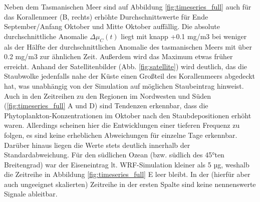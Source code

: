 \documentclass[12pt,a4paper,onecolumn,headheight=30pt]{scrartcl}
\begin{document}
Neben dem Tasmanischen Meer sind auf Abbildung \ref{fig:timeseries_full} auch für das Korallenmeer (B, rechts) erhöhte Durchschnittswerte für Ende September/Anfang Oktober und Mitte Oktober auffällig. Die absolute durchschnittliche Anomalie $\Delta \mu_C(t)$ liegt mit knapp +0.1 mg/m3 bei weniger als der Hälfte der durchschnittlichen Anomalie des tasmanischen Meers mit über 0.2 mg/m3 zur ähnlichen Zeit. Außerdem wird das Maximum etwas früher erreicht. Anhand der Satellitenbilder (Abb. \ref{fig:satellite}) wird deutlich, das die Staubwolke jedenfalls nahe der Küste einen Großteil des Korallenmeers abgedeckt hat, was unabhängig von der Simulation auf möglichen Staubeintrag hinweist. Auch in den Zeitreihen zu den Regionen im Nordwesten und Süden (\ref{fig:timeseries_full} A und D) sind Tendenzen erkennbar, dass die Phytoplankton-Konzentrationen im Oktober nach den Staubdepositionen erhöht waren. Allerdings scheinen hier die Entwicklungen einer tieferen Frequenz zu folgen, es sind keine erheblichen Abweichungen für einzelne Tage erkennbar. Darüber hinaus liegen die Werte stets deutlich innerhalb der Standardabweichung. Für den südlichen Ozean (bzw. südlich des 45°ten Breitengrad) war der Eiseneintrag lt. WRF-Simulation kleiner als 5 µg, weshalb die Zeitreihe in Abbildung \ref{fig:timeseries_full} E leer bleibt. In der (hierfür aber auch  ungeeignet skalierten) Zeitreihe in der ersten Spalte sind keine nennenswerte Signale ableitbar.
\end{document}
